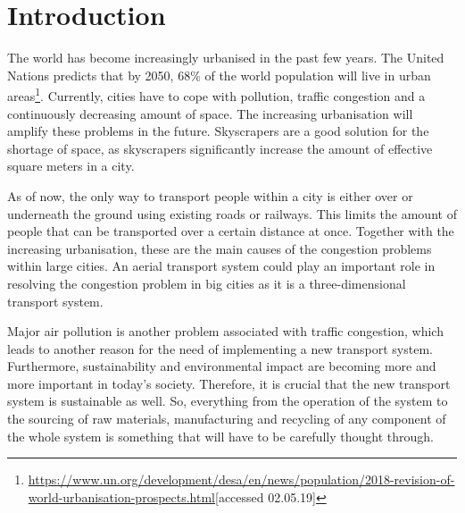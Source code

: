 \newpage
\chapter{Introduction}

The world has become increasingly urbanised in the past few years. The United Nations predicts that by 2050, 68\% of the world population will live in urban areas\footnote{\url{https://www.un.org/development/desa/en/news/population/2018-revision-of-world-urbanisation-prospects.html}[accessed 02.05.19]}. Currently, cities have to cope with pollution, traffic congestion and a continuously decreasing amount of space. The increasing urbanisation will amplify these problems in the future. Skyscrapers are a good solution for the shortage of space, as skyscrapers significantly increase the amount of effective square meters in a city.

As of now, the only way to transport people within a city is either over or underneath the ground using existing roads or railways. This limits the amount of people that can be transported over a certain distance at once. Together with the increasing urbanisation, these are the main causes of the congestion problems within large cities. An aerial transport system could play an important role in resolving the congestion problem in big cities as it is a three-dimensional transport system. 


Major air pollution is another problem associated with traffic congestion, which leads to another reason for the need of implementing a new transport system. Furthermore, sustainability and environmental impact are becoming more and more important in today's society. Therefore, it is crucial that the new transport system is sustainable as well. So, everything from the operation of the system to the sourcing of raw materials, manufacturing and recycling of any component of the whole system is something that will have to be carefully thought through.


